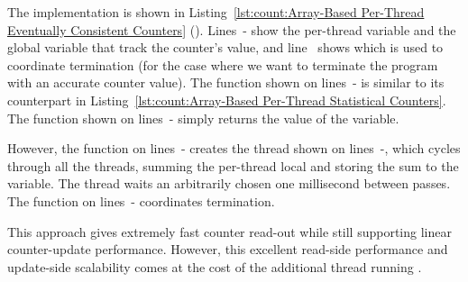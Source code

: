 \begin{lineref}
The implementation is shown in
Listing~\ref{lst:count:Array-Based Per-Thread Eventually Consistent Counters}
().
Lines~-
show the per-thread variable and the global variable that
track the counter's value, and line~ shows 
which is used to coordinate termination (for the case where we want
to terminate the program with an accurate counter value).
The  function shown on
lines~- is similar to its
counterpart in
Listing~\ref{lst:count:Array-Based Per-Thread Statistical Counters}.
The  function shown on
lines~- simply returns the
value of the  variable.

However, the  function on
lines~-
creates the  thread shown on
lines~-, which
cycles through all the threads,
summing the per-thread local  and storing the
sum to the  variable.
The  thread waits an arbitrarily chosen one millisecond
between passes.
The  function on
lines~- coordinates termination.

This approach gives extremely fast counter read-out while still
supporting linear counter-update performance.
However, this excellent read-side performance and update-side scalability
comes at the cost of the additional thread running .
\end{lineref}

